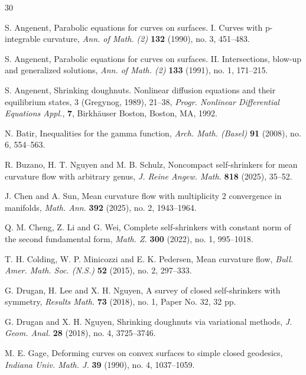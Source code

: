 \documentclass{amsart}
\theoremstyle{Corollary}
\numberwithin{equation}{section}
\begin{document}
 






\begin{thebibliography}{30}

S. Angenent,
Parabolic equations for curves on surfaces. I. Curves with p-integrable curvature,
\textit{Ann. of Math. (2)} \textbf{132} (1990), no. 3, 451–483.


S. Angenent,
Parabolic equations for curves on surfaces. II. Intersections, blow-up and generalized solutions,
\textit{Ann. of Math. (2)} \textbf{133} (1991), no. 1, 171–215.


S. Angenent,
  Shrinking doughnuts. Nonlinear diffusion equations and their equilibrium states, 3 (Gregynog, 1989), 21–38, \textit{Progr. Nonlinear Differential Equations Appl.}, \textbf{7},
  Birkh\"{a}user Boston, Boston, MA, 1992.


N. Batir,
Inequalities for the gamma function,
\textit{Arch. Math. (Basel)} \textbf{91} (2008), no. 6, 554–563.

R. Buzano, H. T. Nguyen and  M. B. Schulz, 
Noncompact self-shrinkers for mean curvature flow with arbitrary genus,  
\textit{J. Reine Angew. Math.} \textbf{818} (2025), 35–52. 

J. Chen and A. Sun,  Mean curvature flow with multiplicity 2 convergence in manifolds, \textit{Math. Ann.} 
\textbf{392} (2025), no. 2, 1943–1964. 

Q. M. Cheng, Z. Li and G. Wei, 
Complete self-shrinkers with constant norm of the second fundamental form,  
\textit{Math. Z.} \textbf{300} (2022), no. 1, 995–1018. 

T. H.  Colding, W. P. Minicozzi and E. K.  Pedersen,
 Mean curvature flow, \textit{Bull. Amer. Math. Soc. (N.S.)} \textbf{52} (2015), no. 2, 297–333. 

G. Drugan, H. Lee and X. H. Nguyen,  A survey of closed self-shrinkers with symmetry, \textit{Results Math.} \textbf{73} (2018), no. 1, Paper No. 32, 32 pp.

 G. Drugan and X. H. Nguyen,
Shrinking doughnuts via variational methods,
\textit{J. Geom. Anal.} \textbf{28} (2018), no. 4, 3725–3746.



M. E. Gage,
Deforming curves on convex surfaces to simple closed geodesics,
\textit{Indiana Univ. Math. J.} \textbf{39} (1990), no. 4, 1037–1059.


\end{thebibliography}
\end{document}

